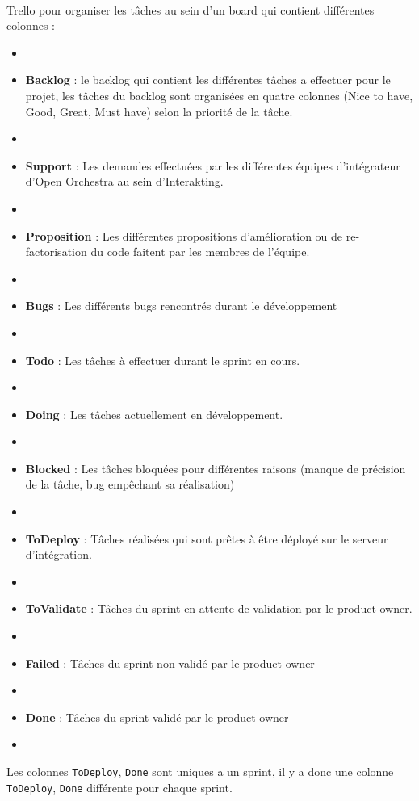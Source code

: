   \paragraph{}
  Trello pour organiser les tâches au sein d'un board qui contient différentes colonnes : 
 \begin{itemize}
 \item[]
 \item \textbf{Backlog} : le backlog qui contient les différentes tâches a effectuer pour le projet, les tâches du backlog sont organisées en quatre colonnes (Nice to have, Good, Great, Must have) selon la priorité de la tâche.
 \item[]
 \item \textbf{Support} : Les demandes effectuées par les différentes équipes d'intégrateur d'Open Orchestra au sein d'Interakting.
\item[]
 \item \textbf{Proposition} : Les différentes propositions d'amélioration ou de re-factorisation du code faitent par les membres de l'équipe.
\item[]
 \item \textbf{Bugs} : Les différents bugs rencontrés durant le développement
\item[]
 \item \textbf{Todo} : Les tâches à effectuer durant le sprint en cours.
\item[]
 \item \textbf{Doing} : Les tâches actuellement en développement.
\item[]
 \item \textbf{Blocked} : Les tâches bloquées pour différentes raisons (manque de précision de la tâche, bug empêchant sa réalisation)
\item[]
 \item \textbf{ToDeploy} : Tâches réalisées qui sont prêtes à être déployé sur le serveur d'intégration.
\item[]
 \item \textbf{ToValidate} : Tâches du sprint en attente de validation par le product owner.
\item[]
 \item \textbf{Failed} : Tâches du sprint non validé par le product owner
\item[]
 \item \textbf{Done} : Tâches du sprint validé par le product owner
 \item[]
 \end{itemize}
Les colonnes \verb?ToDeploy?, \verb?Done? sont uniques a un sprint, il y a donc une colonne \verb?ToDeploy?, \verb?Done? différente pour chaque sprint.

